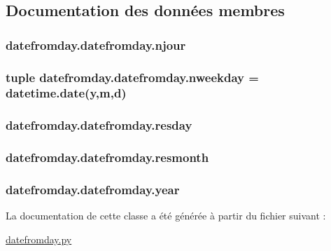\subsection{Documentation des données membres}
\hypertarget{classdatefromday_1_1datefromday_a4f9694b8f18756495c1d79fdb6967350}{
\subsubsection[{njour}]{\setlength{\rightskip}{0pt plus 5cm}datefromday.\-datefromday.\-njour}}\label{classdatefromday_1_1datefromday_a4f9694b8f18756495c1d79fdb6967350}
\hypertarget{classdatefromday_1_1datefromday_aea92e2e72937fab296b235453854f0c8}{
\subsubsection[{nweekday}]{\setlength{\rightskip}{0pt plus 5cm}tuple datefromday.\-datefromday.\-nweekday = datetime.\-date(y,m,d)\hspace{0.3cm}{\ttfamily [static]}}}\label{classdatefromday_1_1datefromday_aea92e2e72937fab296b235453854f0c8}
\hypertarget{classdatefromday_1_1datefromday_a82528e422e7b12f870894efafa9677db}{
\subsubsection[{resday}]{\setlength{\rightskip}{0pt plus 5cm}datefromday.\-datefromday.\-resday}}\label{classdatefromday_1_1datefromday_a82528e422e7b12f870894efafa9677db}
\hypertarget{classdatefromday_1_1datefromday_ac29c28e89d058d5a9c175c74ba604e8d}{
\subsubsection[{resmonth}]{\setlength{\rightskip}{0pt plus 5cm}datefromday.\-datefromday.\-resmonth}}\label{classdatefromday_1_1datefromday_ac29c28e89d058d5a9c175c74ba604e8d}
\hypertarget{classdatefromday_1_1datefromday_a705eb03010097a53a5813aedb360ee30}{
\subsubsection[{year}]{\setlength{\rightskip}{0pt plus 5cm}datefromday.\-datefromday.\-year}}\label{classdatefromday_1_1datefromday_a705eb03010097a53a5813aedb360ee30}


La documentation de cette classe a été générée à partir du fichier suivant \-:\begin{DoxyCompactItemize}
\item 
\hyperlink{datefromday_8py}{datefromday.\-py}\end{DoxyCompactItemize}

